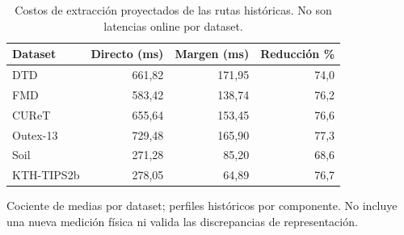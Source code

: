 \begin{table}[!htbp]\centering
\fontsize{9}{11}\selectfont\setlength{\tabcolsep}{4pt}
\caption{Costos de extracción proyectados de las rutas históricas. No son latencias online por dataset.}\label{tab:tm-costos}
\begin{tabular}{@{}lrrr@{}}\toprule
Dataset & Directo (ms) & Margen (ms) & Reducción \%\\\midrule
DTD & 661,82 & 171,95 & 74,0\\
FMD & 583,42 & 138,74 & 76,2\\
CUReT & 655,64 & 153,45 & 76,6\\
Outex-13 & 729,48 & 165,90 & 77,3\\
Soil & 271,28 & 85,20 & 68,6\\
KTH-TIPS2b & 278,05 & 64,89 & 76,7\\
\bottomrule\end{tabular}
\par\smallskip\begin{minipage}{0.98\textwidth}\footnotesize Cociente de medias por dataset; perfiles históricos por componente. No incluye una nueva medición física ni valida las discrepancias de representación.\end{minipage}
\end{table}
